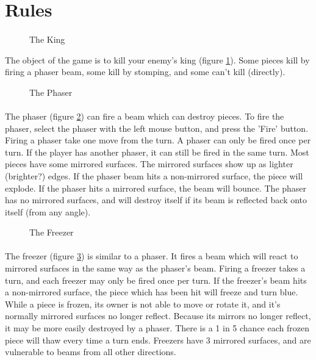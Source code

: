\newpage

\section*{Rules}
\paragraph[]{}

\begin{figure}[htb]
	\caption{The King}
	\label{king}
\end{figure}

The object of the game is to kill your enemy's king (figure
\ref{king}).  Some pieces kill by firing a phaser beam, some kill by
stomping, and some can't kill (directly).


\begin{figure}[htb]
	\caption{The Phaser}
	\label{phaser}
\end{figure}

\paragraph[]{}
The phaser (figure \ref{phaser}) can fire a beam which can destroy
pieces.  To fire the phaser, select the phaser with the left mouse
button, and press the 'Fire' button.  Firing a phaser take one move
from the turn.  A phaser can only be fired once per turn.  If the
player has another phaser, it can still be fired in the same turn.
Most pieces have some mirrored surfaces.  The mirrored surfaces show
up as lighter (brighter?)  edges.  If the phaser beam hits a
non-mirrored surface, the piece will explode.  If the phaser hits a
mirrored surface, the beam will bounce.  The phaser has no mirrored
surfaces, and will destroy itself if its beam is reflected back onto
itself (from any angle).


\begin{figure}[htb]
	\caption{The Freezer}
	\label{freezer}
\end{figure}

\paragraph[]{}
The freezer (figure \ref{freezer}) is similar to a phaser.  It fires a
beam which will react to mirrored surfaces in the same way as the
phaser's beam.  Firing a freezer takes a turn, and each freezer may
only be fired once per turn.  If the freezer's beam hits a
non-mirrored surface, the piece which has been hit will freeze and
turn blue.  While a piece is frozen, its owner is not able to move or
rotate it, and it's normally mirrored surfaces no longer reflect.
Because its mirrors no longer reflect, it may be more easily destroyed
by a phaser.  There is a 1 in 5 chance each frozen piece will thaw
every time a turn ends.  Freezers have 3 mirrored surfaces, and
are vulnerable to beams from all other directions.


